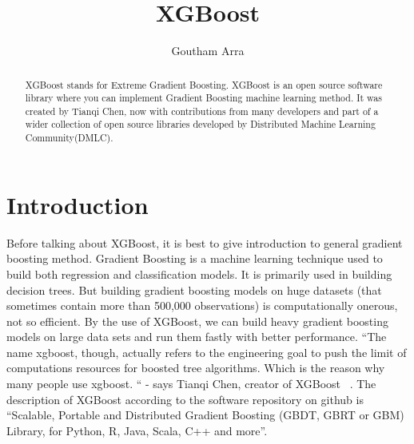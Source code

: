 
\title{XGBoost}


\author{Goutham Arra}




\begin{abstract} 
XGBoost stands for Extreme Gradient Boosting. XGBoost is an
open source software library where you can  implement Gradient Boosting machine
learning method. It was created by Tianqi Chen, now with contributions from many
developers and part of a wider collection of open source libraries developed by
Distributed Machine Learning Community(DMLC).
\end{abstract}



\maketitle


\section{Introduction}  

Before talking about XGBoost, it is best to give introduction to general
gradient boosting method. Gradient Boosting is a machine learning technique used
to build both regression and classification models. It is primarily used in
building decision trees. But building gradient boosting models on huge datasets
(that sometimes contain more than 500,000 observations) is computationally
onerous, not so efficient. By the use of XGBoost, we can build  heavy gradient
boosting models on large data sets and run them fastly with better performance.
“The name xgboost, though, actually refers to the engineering goal to push the
limit of computations resources for boosted tree algorithms. Which is the reason
why many people use xgboost. “ - says Tianqi Chen, creator of XGBoost ~\cite
{hid-sp18-401-XGBoost-MLmastery}. The description of XGBoost according to the
software repository on github is “Scalable, Portable and Distributed Gradient
Boosting (GBDT, GBRT or GBM) Library, for Python, R, Java, Scala, C++ and more”.




